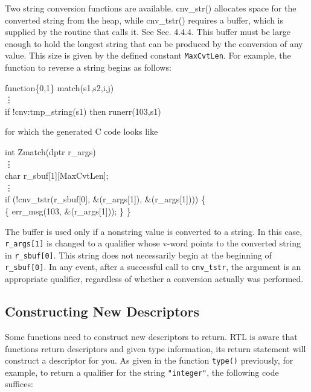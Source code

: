Two string conversion functions are available. cnv\_str() allocates
space for the converted string from the heap, while cnv\_tstr()
requires a buffer, which is supplied by the routine that calls it.
See Sec. 4.4.4. This buffer must be large enough to hold the longest
string that can be produced by the conversion of any value. This size
is given by the defined constant \texttt{MaxCvtLen}. For example, the
function to reverse a string begins as follows:

\goodbreak
\begin{iconcode}
function\{0,1\} match(s1,s2,i,j)\\
\>   \vdots \\
\>   if !cnv:tmp\_string(s1) then runerr(103,s1)
\end{iconcode}

for which the generated C code looks like

\begin{iconcode}
int Zmatch(dptr r\_args)\\
\>   \vdots \\
\>   char r\_sbuf[1][MaxCvtLen]; \\
\>   \vdots \\
\>   if (!cnv\_tstr(r\_sbuf[0], \&(r\_args[1]), \&(r\_args[1]))) \{ \\
      \{ err\_msg(103, \&(r\_args[1])); \} \}
\end{iconcode}

\noindent
The buffer is used only if a nonstring value is converted to a string. In this
case, \texttt{r\_args[1]} is changed to a qualifier whose v-word points to the
converted string in \texttt{r\_sbuf[0]}. This string does not
necessarily begin at the beginning of \texttt{r\_sbuf[0]}. In any
event, after a successful call to \texttt{cnv\_tstr}, the argument
is an appropriate qualifier, regardless of whether
a conversion actually was performed.

\subsection{Constructing New Descriptors}

Some functions need to construct new descriptors to return.  RTL is
aware that functions return descriptors and given type information,
its return statement will construct a descriptor for you. As given
in the function \texttt{type()} previously, for example, to return
a qualifier for the string \texttt{"integer"}, the following code suffices:

